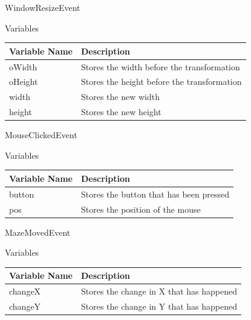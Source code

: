 \documentclass[../../Main.tex]{subfiles}
\begin{document}
    WindowResizeEvent
    \begin{center}
        Variables
        \begin{tabular}{ | m{} | m{} | }
            \hline
            \textbf{Variable Name} & \textbf{Description} \\
            \hline
            oWidth & Stores the width before the transformation \\
            \hline
            oHeight & Stores the height before the transformation \\
            \hline
            width & Stores the new width \\
            \hline
            height & Stores the new height \\
            \hline
        \end{tabular}
    \end{center}
    MouseClickedEvent
    \begin{center}
        Variables
        \begin{tabular}{ | m{} | m{} | }
            \hline
            \textbf{Variable Name} & \textbf{Description} \\
            \hline
            button & Stores the button that has been pressed \\
            \hline
            pos & Stores the position of the mouse \\
            \hline
        \end{tabular}
    \end{center}
    MazeMovedEvent
    \begin{center}
        Variables
        \begin{tabular}{ | m{} | m{} | }
            \hline
            \textbf{Variable Name} & \textbf{Description} \\
            \hline
            changeX & Stores the change in X that has happened \\
            \hline
            changeY & Stores the change in Y that has happened \\
            \hline
        \end{tabular}
    \end{center}
\end{document}
